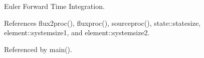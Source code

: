 Euler Forward Time Integration. 



References flux2proc(), fluxproc(), sourceproc(), state\-::statesize, element\-::systemsize1, and element\-::systemsize2.



Referenced by main().

